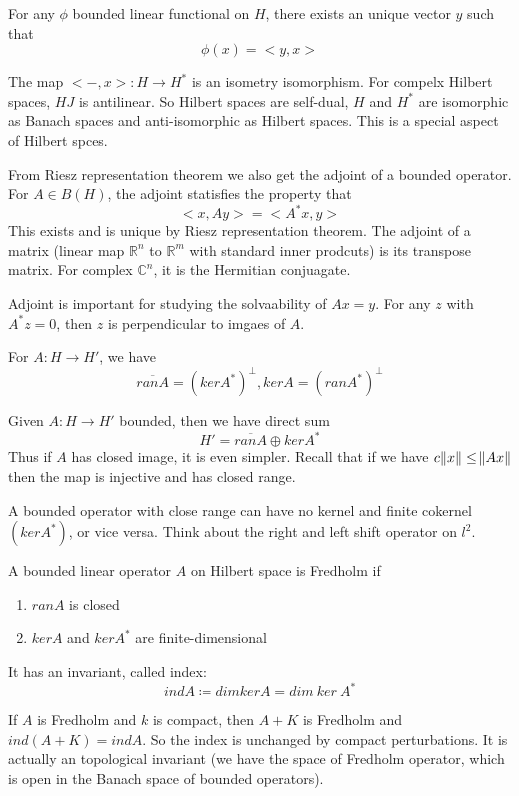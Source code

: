 \documentclass[main.tex]{subfiles}
\begin{document}
\begin{theorem}
For any $\phi$ bounded linear functional on $H$, there exists an unique vector $y$ such that 
$$
\phi(x) = <y,x>
$$
\end{theorem}
The map $<-, x>: H \rightarrow H^*$ is an isometry isomorphism. For compelx Hilbert spaces, $HJ$ is antilinear. So Hilbert spaces are self-dual, $H$ and $H^*$ are isomorphic as Banach spaces and anti-isomorphic as Hilbert spaces. This is a special aspect of Hilbert spces.

From Riesz representation theorem we also get the adjoint of a bounded operator. For $A \in B(H)$, the adjoint statisfies the property that 
$$
<x, Ay> = <A^* x, y>
$$
This exists and is unique by Riesz representation theorem. The adjoint of a matrix (linear map $\mathbb{R}^n$ to $\mathbb{R}^m$ with standard inner prodcuts) is its transpose matrix. For complex $\mathbb{C}^n$, it is the Hermitian conjuagate.

Adjoint is important for studying the solvaability of $Ax = y$. For any $z$ with $A^* z = 0$, then $z$ is perpendicular to imgaes of $A$. 

\begin{theorem}
For $A: H \rightarrow H'$, we have 
$$
\overline{ran A} = (ker A^*)^\perp, ker A = (ran A^*)^\perp
$$
\end{theorem}
Given $A: H \rightarrow H'$ bounded, then we have direct sum 
$$
H' = \overline{ran A} \oplus ker A^*
$$
Thus if $A$ has closed image, it is even simpler. Recall that if we have $c \norm{x} \leq \norm{Ax}$ then the map is injective and has closed range. 

A bounded operator with close range can have no kernel and finite cokernel $(ker A^*)$, or vice versa. Think about the right and left shift operator on $l^2$. 

\begin{definition}
A bounded linear operator $A$ on Hilbert space is Fredholm if
\begin{enumerate}
    \item $ran A$ is closed
    \item $ker A$ and $ker A^*$ are finite-dimensional
\end{enumerate}
\end{definition}
It has an invariant, called index:
$$
ind A \coloneqq dim ker A = dim\ ker \ A^*
$$

If $A$ is Fredholm and $k$ is compact, then $A + K$ is Fredholm and $ind(A + K) = ind A$. So the index is unchanged by compact perturbations. It is actually an topological invariant (we have the space of Fredholm operator, which is open in the Banach space of bounded operators).
\end{document}
